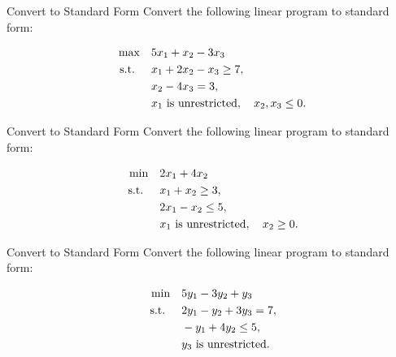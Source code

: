 \begin{ex}{Convert to Standard Form}{}
\label{ex:standard-form-3}
 Convert the following linear program to standard form:

\[
\begin{aligned}
    \max \quad & 5x_1 + x_2 - 3x_3 \\
    \mbox{ s.t. } \quad
    & x_1 + 2x_2 - x_3 \geq 7, \\
    & x_2 - 4x_3 = 3, \\
    & x_1 \mbox{ is unrestricted}, \quad x_2, x_3 \leq 0.
\end{aligned}
\]
\end{ex}

\begin{ex}{Convert to Standard Form}{}
\label{ex:84}
 Convert the following linear program to standard form:

\[
\begin{aligned}
    \min \quad & 2x_1 + 4x_2 \\
    \mbox{ s.t. } \quad
    & x_1 + x_2 \geq 3, \\
    & 2x_1 - x_2 \leq 5, \\
    & x_1 \mbox{ is unrestricted}, \quad x_2 \geq 0.
\end{aligned}
\]
\end{ex}

\begin{ex}{Convert to Standard Form}{}
\label{ex:85}
 Convert the following linear program to standard form:

\[
\begin{aligned}
    \min \quad & 5y_1 - 3y_2 + y_3 \\
    \mbox{ s.t. } \quad
    & 2y_1 - y_2 + 3y_3 = 7, \\
    & -y_1 + 4y_2 \leq 5, \\
    & y_3 \mbox{ is unrestricted}.
\end{aligned}
\]
\end{ex}



